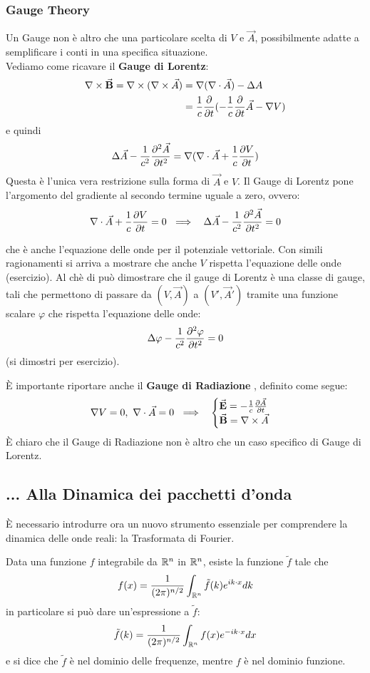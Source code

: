 \subsubsection*{Gauge Theory} 
Un Gauge non è altro che una particolare scelta di $V$ e $\vec A$, possibilmente adatte a semplificare i conti in una specifica situazione.\\
Vediamo come ricavare il \textbf{Gauge di Lorentz}: 
\begin{align*}
	\nabla\times\vec{\textbf{B}} = \nabla\times (\nabla\times\vec A) &= \nabla (\nabla\cdot\vec A) - \Delta A \\
	&=\frac{1}{c} \frac{\partial }{\partial t} (- \frac{1}{c} \frac{\partial }{\partial t} \vec A - \nabla V) 
\end{align*}
e quindi 
\[
	\Delta \vec A - \frac{1}{c^2} \frac{\partial^2 \vec A}{\partial t^2} = \nabla (\nabla\cdot\vec A + \frac{1}{c} \frac{\partial V}{\partial t})
\]
Questa è l'unica vera restrizione sulla forma di $\vec A$ e $V$.
Il Gauge di Lorentz pone l'argomento del gradiente al secondo termine uguale a zero, ovvero:
\[
	\nabla\cdot\vec A + \frac{1}{c} \frac{\partial V}{\partial t} = 0 \ \implies\ \ \Delta \vec A - \frac{1}{c^2} \frac{\partial^2 \vec A}{\partial t^2} = 0
\]

che è anche l'equazione delle onde per il potenziale vettoriale. Con simili ragionamenti si arriva a mostrare che anche $V$ rispetta l'equazione delle onde (esercizio).
Al chè di può dimostrare che il gauge di Lorentz è una classe di gauge, tali che permettono di passare da $(V, \vec A)$ a $(V', \vec A')$ tramite una funzione scalare $\varphi$ che rispetta l'equazione delle onde:
\[
	\Delta \varphi - \frac{1}{c^2} \frac{\partial^2 \varphi}{\partial t^2} = 0
\]
(si dimostri per esercizio).

È importante riportare anche il \textbf{Gauge di Radiazione} , definito come segue:
\[
	\Grad V = 0,\ \vDiv A = 0 \ \implies\ \ 
	\begin{cases}
		\vect E = - \invc \vtderiv{A} \\
		\vect B = \vCurl A
	\end{cases}
\]
È chiaro che il Gauge di Radiazione non è altro che un caso specifico di Gauge di Lorentz.


\subsection{... Alla Dinamica dei pacchetti d'onda}
È necessario introdurre ora un nuovo strumento essenziale per comprendere la dinamica delle onde reali: la Trasformata di Fourier.
\fidaty
\begin{definizione}[Trasformata di Fourier] 
Data una funzione $f$ integrabile da $\mathbb{R}^n$ in $\mathbb{R}^n$, esiste la funzione $\tilde f$ tale che
\[
	f(x) = \frac{1}{(2 \pi)^{n/2}} \int_{\mathbb{R}^n} \tilde f(k) e^{ik\cdot x} dk
\]
in particolare si può dare un'espressione a $\tilde f$:
\[
	\tilde f(k) = \frac{1}{(2 \pi)^{n/2}} \int_{\mathbb{R}^n} f(x) e^{-ik\cdot x} dx
\]
e si dice che $\tilde f$ è nel dominio delle frequenze, mentre $f$ è nel dominio funzione.
\end{definizione}


